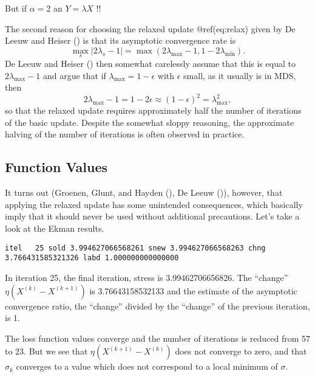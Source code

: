\documentclass[
  12pt,
  letterpaper,
  DIV=11,
  numbers=noendperiod]{scrartcl}
\begin{document}
But if \(\alpha=2\) an \(Y=\lambda X\) !!

The second reason for choosing the relaxed update @ref(eq:relax) given
by De Leeuw and Heiser () is
that its asymptotic convergence rate is \begin{equation}
\max_s|2\lambda_s-1|=\max(2\lambda_{\text{max}}-1,1-2\lambda_{\text{min}}).
\end{equation} De Leeuw and Heiser
() then somewhat carelessly
assume that this is equal to \(2\lambda_{\text{max}}-1\) and argue that
if \(\lambda_{\text{max}}=1-\epsilon\) with \(\epsilon\) small, as it
usually is in MDS, then \begin{equation}
2\lambda_{\text{max}}-1=1-2\epsilon\approx(1-\epsilon)^2=\lambda_{\text{max}}^2,
\end{equation} so that the relaxed update requires approximately half
the number of iterations of the basic update. Despite the somewhat
sloppy reasoning, the approximate halving of the number of iterations is
often observed in practice.

\subsection{Function Values}\label{function-values-4}

It turns out (Groenen, Glunt, and Hayden
(), De Leeuw
()), however, that applying the
relaxed update has some unintended consequences, which basically imply
that it should never be used without additional precautions. Let's take
a look at the Ekman results.

\begin{verbatim}
itel   25 sold 3.994627066568261 snew 3.994627066568263 chng 3.766431585321326 labd 1.000000000000000 
\end{verbatim}

In iteration 25, the final iteration, stress is 3.99462706656826. The
``change'' \(\eta(X^{(k)}-X^{(k+1)})\) is 3.76643158532133 and the
estimate of the asymptotic convergence ratio, the ``change'' divided by
the ``change'' of the previous iteration, is 1.

The loss function values converge and the number of iterations is
reduced from 57 to 23. But we see that \(\eta(X^{(k+1)}-X^{(k)})\) does
not converge to zero, and that \(\sigma_k\) converges to a value which
does not correspond to a local minimum of \(\sigma\).
\end{document}
